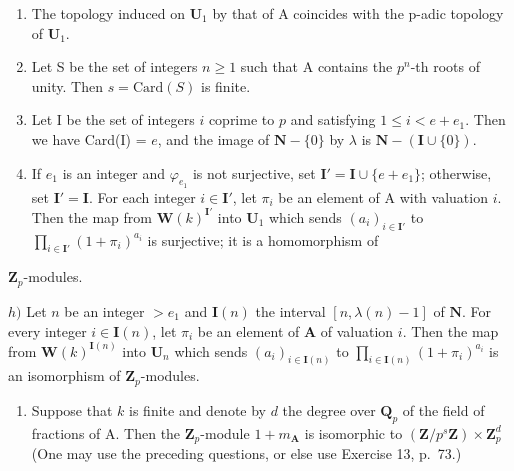 \begin{enumerate}
\def\labelenumi{\alph{enumi})}
\setcounter{enumi}{3}
\item
  The topology induced on \(\mathbf{U}_1\) by that of A coincides with the p-adic topology of \(\mathbf{U}_1\).
\item
  Let S be the set of integers \(n \geqslant 1\) such that A contains the \(p^n\)-th roots of unity. Then \(s = \text{Card}(S)\) is finite.
\item
  Let I be the set of integers \(i\) coprime to \(p\) and satisfying \(1 \leqslant i < e + e_1\). Then we have Card(I) = \(e\), and the image of \(\mathbf{N} - \{0\}\) by \(\lambda\) is \(\mathbf{N} - (\mathbf{I} \cup \{0\})\).
\item
  If \(e_1\) is an integer and \(\varphi_{e_1}\) is not surjective, set \(\mathbf{I}' = \mathbf{I} \cup \{e + e_1\}\); otherwise, set \(\mathbf{I}' = \mathbf{I}\). For each integer \(i \in \mathbf{I}'\), let \(\pi_i\) be an element of A with valuation \(i\). Then the map from \(\mathbf{W}(k)^{\mathbf{I}'}\) into \(\mathbf{U}_1\) which sends \((a_i)_{i \in \mathbf{I}'}\) to \(\prod_{i \in \mathbf{I}'} (1 + \pi_i)^{a_i}\) is surjective; it is a homomorphism of
\end{enumerate}

\(\mathbf{Z}_{p}\)-modules.

\(h)\) Let \(n\) be an integer \(>e_{1}\) and \(\mathbf{I}(n)\) the interval \([n, \lambda(n) - 1]\) of \(\mathbf{N}\). For every integer \(i \in \mathbf{I}(n)\), let \(\pi_{i}\) be an element of \(\mathbf{A}\) of valuation \(i\). Then the map from \(\mathbf{W}(k)^{\mathbf{I}(n)}\) into \(\mathbf{U}_{n}\) which sends \((a_{i})_{i \in \mathbf{I}(n)}\) to \(\prod_{i \in \mathbf{I}(n)} (1 + \pi_{i})^{a_{i}}\) is an isomorphism of \(\mathbf{Z}_{p}\)-modules.

\begin{enumerate}
\def\labelenumi{\roman{enumi})}
\tightlist
\item
  Suppose that \(k\) is finite and denote by \(d\) the degree over \(\mathbf{Q}_{p}\) of the field of fractions of A. Then the \(\mathbf{Z}_{p}\)-module \(1 + m_{\mathbf{A}}\) is isomorphic to \((\mathbf{Z}/p^{s}\mathbf{Z}) \times \mathbf{Z}_{p}^{d}\) (One may use the preceding questions, or else use Exercise 13, p.~73.)
\end{enumerate}

